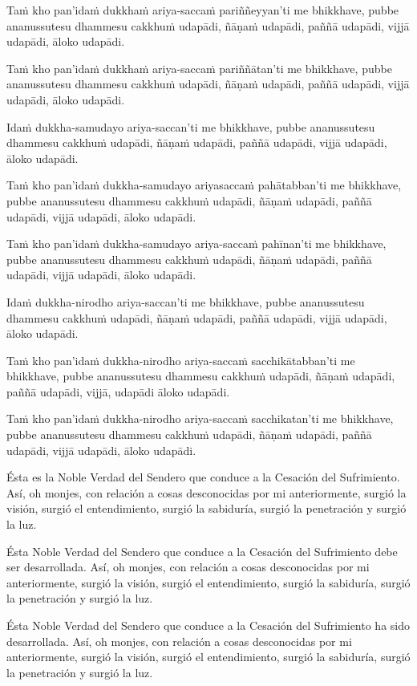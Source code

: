 \clearpage

\paliText
\markboth{\paliTitle}{\rightmark}

Taṁ kho pan'idaṁ dukkhaṁ ariya-saccaṁ pariññeyyan'ti me bhikkhave, pubbe
ananussutesu dhammesu cakkhuṁ udapādi, ñāṇaṁ udapādi, paññā udapādi,
vijjā udapādi, āloko udapādi.

Taṁ kho pan'idaṁ dukkhaṁ ariya-saccaṁ pariññātan'ti me bhikkhave, pubbe
ananussutesu dhammesu cakkhuṁ udapādi, ñāṇaṁ udapādi, paññā udapādi,
vijjā udapādi, āloko udapādi.

Idaṁ dukkha-samudayo ariya-saccan'ti me bhikkhave, pubbe ananussutesu
dhammesu cakkhuṁ udapādi, ñāṇaṁ udapādi, paññā udapādi, vijjā udapādi,
āloko udapādi.

Taṁ kho pan'idaṁ dukkha-samudayo ariyasaccaṁ pahātabban'ti me bhikkhave,
pubbe ananussutesu dhammesu cakkhuṁ udapādi, ñāṇaṁ udapādi, paññā
udapādi, vijjā udapādi, āloko udapādi.

Taṁ kho pan'idaṁ dukkha-samudayo ariya-saccaṁ pahīnan'ti me bhikkhave, pubbe
ananussutesu dhammesu cakkhuṁ udapādi, ñāṇaṁ udapādi, paññā udapādi,
vijjā udapādi, āloko udapādi.

Idaṁ dukkha-nirodho ariya-saccan'ti me bhikkhave, pubbe ananussutesu
dhammesu cakkhuṁ udapādi, ñāṇaṁ udapādi, paññā udapādi, vijjā udapādi,
āloko udapādi.

Taṁ kho pan'idaṁ dukkha-nirodho ariya-saccaṁ sacchikātabban'ti me bhikkhave,
pubbe ananussutesu dhammesu cakkhuṁ udapādi, ñāṇaṁ udapādi, paññā
udapādi, vijjā, udapādi āloko udapādi.

Taṁ kho pan'idaṁ dukkha-nirodho ariya-saccaṁ sacchikatan'ti me bhikkhave,
pubbe ananussutesu dhammesu cakkhuṁ udapādi, ñāṇaṁ udapādi, paññā
udapādi, vijjā udapādi, āloko udapādi.

\clearpage

\englishText
\markboth{\englishTitle}{\rightmark}
Ésta es la Noble Verdad del Sendero que conduce a la Cesación del Sufrimiento. Así, oh monjes, con relación a cosas desconocidas por mi anteriormente, surgió la visión, surgió el entendimiento, surgió la sabiduría, surgió la penetración y surgió la luz.

Ésta Noble Verdad del Sendero que conduce a la Cesación del Sufrimiento debe ser desarrollada. Así, oh monjes, con relación a cosas desconocidas por mi anteriormente, surgió la visión, surgió el entendimiento, surgió la sabiduría, surgió la penetración y surgió la luz.

Ésta Noble Verdad del Sendero que conduce a la Cesación del Sufrimiento ha sido desarrollada. Así, oh monjes, con relación a cosas desconocidas por mi anteriormente, surgió la visión, surgió el entendimiento, surgió la sabiduría, surgió la penetración y surgió la luz.

